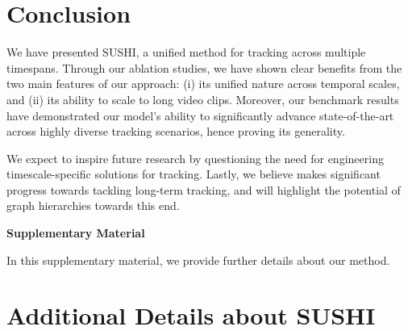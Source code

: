 \documentclass[10pt,twocolumn,letterpaper]{article}
\begin{document}
{{ 
\section{Conclusion}
\label{sec:conclusion}
We have presented SUSHI, a unified method for tracking across multiple timespans. Through our ablation studies, we have shown clear benefits from the two main features of our approach: (i) its unified nature across temporal scales, and (ii) its ability to scale to long video clips.  Moreover, our benchmark results have demonstrated our model's ability  to significantly advance state-of-the-art across highly diverse tracking scenarios, hence proving its generality. 

We expect \modelname to inspire future research by questioning the need for engineering timescale-specific solutions for tracking. Lastly, we believe \modelname makes significant progress towards tackling long-term tracking, and will highlight the potential of graph hierarchies towards this end.



 
\smallskip
















\newpage
{\small


}

\clearpage
\appendix

\textbf{{\Large Supplementary Material}}
\newline






In this supplementary material, we provide further details about our method. 


\section{Additional Details about SUSHI }\label{sec:method_supplementary} 
}}
\end{document}
